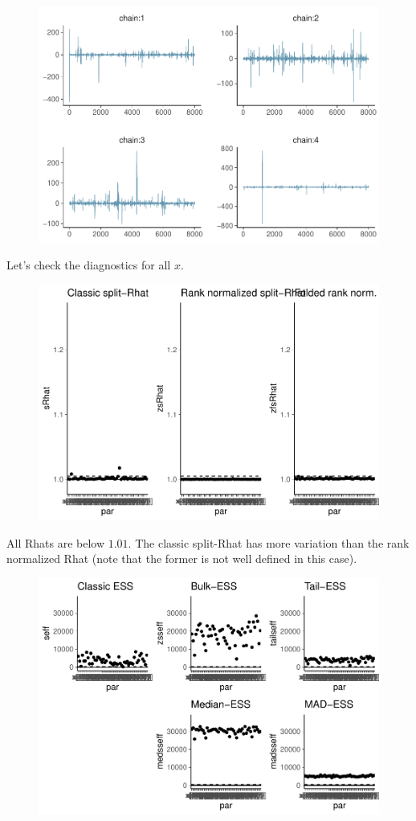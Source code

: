 \documentclass[american,]{article}
\begin{document}
\begin{figure}[t]
  \centering
  \includegraphics[width=0.6\linewidth]{graphics/trace-fit-nom-td20l-1.pdf}
\end{figure}

Let's check the diagnostics for all \(x\).

\begin{figure}[t]
  \centering
  \includegraphics[width=0.6\linewidth]{graphics/rhat-fit-nom-td20l-1.pdf}
\end{figure}

All Rhats are below \(1.01\). The classic split-Rhat has more variation
than the rank normalized Rhat (note that the former is not well defined
in this case).

\begin{figure}[t]
  \centering
  \includegraphics[width=0.6\linewidth]{graphics/ess-fit-nom-td20l-1.pdf}
\end{figure}
\end{document}

